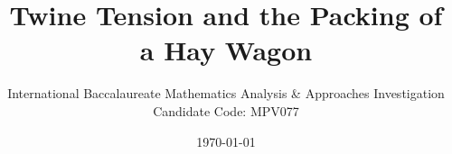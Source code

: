 \newcommand{\thesubtitle}{}
\newcommand{\subtitle}[1]{\renewcommand{\thesubtitle}{#1}}

\title{Twine Tension and the Packing of a Hay Wagon}
\subtitle{How does the tension in a small square bale's binding twine determine the packing efficiency of a hay wagon?}
\author{International Baccalaureate Mathematics Analysis \& Approaches Investigation \\ Candidate Code: MPV077}
\date{\today}

\pagestyle{empty}
\tableofcontents
\newpage
\pagestyle{fancy}

